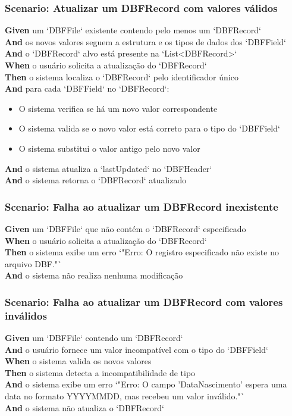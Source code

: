 \subsubsection{Scenario: Atualizar um DBFRecord com valores válidos}
\textbf{Given} um `DBFFile` existente contendo pelo menos um `DBFRecord` \\
\textbf{And} os novos valores seguem a estrutura e os tipos de dados dos `DBFField` \\
\textbf{And} o `DBFRecord` alvo está presente na `List<DBFRecord>` \\
\textbf{When} o usuário solicita a atualização do `DBFRecord` \\
\textbf{Then} o sistema localiza o `DBFRecord` pelo identificador único \\
\textbf{And} para cada `DBFField` no `DBFRecord`:
\begin{itemize}
    \item O sistema verifica se há um novo valor correspondente
    \item O sistema valida se o novo valor está correto para o tipo do `DBFField`
    \item O sistema substitui o valor antigo pelo novo valor
\end{itemize}
\textbf{And} o sistema atualiza a `lastUpdated` no `DBFHeader` \\
\textbf{And} o sistema retorna o `DBFRecord` atualizado

\subsubsection{Scenario: Falha ao atualizar um DBFRecord inexistente}
\textbf{Given} um `DBFFile` que não contém o `DBFRecord` especificado \\
\textbf{When} o usuário solicita a atualização do `DBFRecord` \\
\textbf{Then} o sistema exibe um erro `"Erro: O registro especificado não existe no arquivo DBF."` \\
\textbf{And} o sistema não realiza nenhuma modificação

\subsubsection{Scenario: Falha ao atualizar um DBFRecord com valores inválidos}
\textbf{Given} um `DBFFile` contendo um `DBFRecord` \\
\textbf{And} o usuário fornece um valor incompatível com o tipo do `DBFField` \\
\textbf{When} o sistema valida os novos valores \\
\textbf{Then} o sistema detecta a incompatibilidade de tipo \\
\textbf{And} o sistema exibe um erro `"Erro: O campo 'DataNascimento' espera uma data no formato YYYYMMDD, mas recebeu um valor inválido."` \\
\textbf{And} o sistema não atualiza o `DBFRecord`


